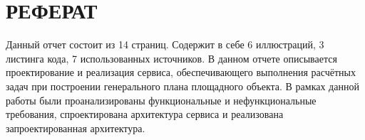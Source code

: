 \section*{\Large{РЕФЕРАТ}}
Данный отчет состоит из 14 страниц.
Содержит в себе 6 иллюстраций, 3 листинга кода, 7 использованных источников.
В данном отчете описывается проектирование и реализация сервиса, обеспечивающего выполнения
расчётных задач при построении генерального плана площадного объекта.
В рамках данной работы были проанализированы функциональные и нефункциональные требования, спроектирована
архитектура сервиса и реализована запроектированная архитектура.